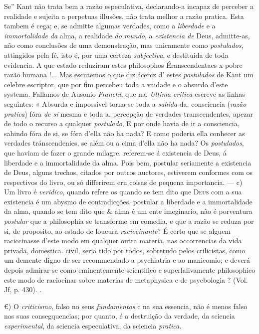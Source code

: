 Se” Kant não trata bem a razão especulativa, declarando-a incapaz de perceber a realidade e sujeita a perpetuas illusões, não trata melhor a razão pratica. Esta tambem é cega; e, se admitte algumas verdades, como a \emph{liberdade} e a \emph{immortalidade da} alma, a realidade \emph{do mundo}, a \emph{existencia de} Deus, admitte-as, não como conclusões de uma demonstração, mas unicamente como \emph{postulados}, attingidos pela fé, isto é, por uma certeza \emph{subjectiva}, e destituida de toda evidencia. A que estado reduziram estes philosophos Éranscendentaes x pobre razão humana !... Mas escutemos o que diz ácercz d' estes \emph{postulados} de Kant um celebre escriptor, que por fim percebeu toda a vaidade e o absurdo d'este systema. Fallamos de Ausonio \emph{Franchi}, que na. \emph{Ultima critica} escreve as linhas seguintes: « Absurda e impossivel torna-se toda a \emph{sahida} da. consciencia (\emph{razão pratica}) fóra \emph{de si} mesma e toda a. percepção de verdades transcendentes, apezar de todo o recurso a qualquer \emph{postulado}, E por onde havia de ir a consciencia, sahindo fóra de si, se fóra d'ella não ha nada? E como poderia ella conhecer as verdades tránscendenies, se além ou a cima d'ella não ha nada? Os \emph{postulados}, que haviam de fazer o grande milagre. referem-se á existencia de Deus, á liberdade e a immortalidade da alma. Pois bem, postular seriamente a existencia de Deus,   alguns trechos, citados por outros auctores, estiverem conformes com os respectivos do livro, ou só differirem ern coisas de pequena importancia. --- c) Um livro é \emph{veridico}, quando refere os quando se tem dito que \textsc{Deus} com a sua existencia é um abysmo de contradicções, postular a liberdade e a immortalidade da alma, quando se tem dito que \& alma é um ente imeginario, não é porventura \emph{postular} que a philosophia se transforme em comedia, e que a razão se reduza por si, de proposito, ao estado de loucura \emph{raciocinante}? É certo que se alguem raciccinasse d'este modo em qualquer outra materia, nas occorrencias da vida privada, domestica. civil, seria tido por todos, sobretudo pelos crilicistas, como um demente digno de ser recommendado a psychiatria e ao manicomio; e deverá depois admirar-se como eminentemente scientifico e superlalivamente philosophico este modo de raciocinar sobre materias de metaphysica e de psycbologia ? (Vol. Jf, p. 430). .

€) O \emph{criticismo}, falso no seus \emph{fundamentos} c na sua essencia, não é menos falso nas suas consegquencias; por quanto, é a destruição da verdade, da sciencia \emph{experimental}, da sciencia especulativa, da sciencia \emph{pratica}.

